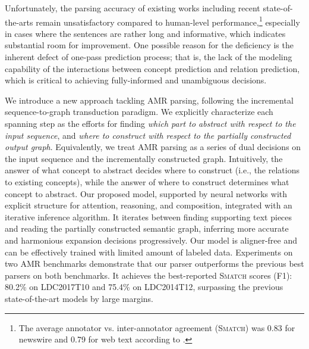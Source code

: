 \documentclass[11pt,a4paper]{article}
\begin{document}
	Unfortunately, the parsing accuracy of existing works including recent state-of-the-arts \cite{zhang-etal-2019-amr,zhang-etal-2019-broad} remain unsatisfactory compared to human-level performance,\footnote{The average annotator vs. inter-annotator agreement (\textsc{Smatch}) was 0.83 for newswire and 0.79 for web text according to .}  especially in cases where the sentences are rather long and informative, which indicates substantial room for improvement. One possible reason for the deficiency is the inherent defect of one-pass prediction process; that is, the lack of the modeling capability of the interactions between concept prediction and relation prediction, which is critical to achieving fully-informed and unambiguous decisions.
	
	We introduce a new approach tackling AMR parsing, following the incremental sequence-to-graph transduction paradigm. We explicitly characterize each spanning step as the efforts for finding \textit{which part to abstract with respect to the input sequence}, and \textit{where to construct with respect to the partially constructed output graph}. Equivalently, we treat AMR parsing as a series of dual decisions on the input sequence and the incrementally constructed graph. Intuitively, the answer of what concept to abstract decides where to construct (i.e., the relations to existing concepts), while the answer of where to construct determines what concept to abstract. Our proposed model, supported by neural networks with explicit structure for attention, reasoning, and composition, integrated with an iterative inference algorithm. It iterates between finding supporting text pieces and reading the partially constructed semantic graph, inferring more accurate and harmonious expansion decisions progressively. Our model is aligner-free and can be effectively trained with limited amount of labeled data. Experiments on two AMR benchmarks demonstrate that our parser outperforms the previous best parsers on both benchmarks. It achieves the best-reported \textsc{Smatch} scores (F1): 80.2\% on LDC2017T10 and 75.4\% on LDC2014T12, surpassing the previous state-of-the-art models by large margins.
\end{document}
